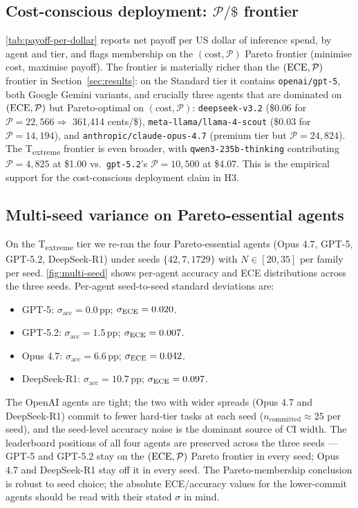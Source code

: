 \subsection{Cost-conscious deployment: $\mathcal{P}/\$$ frontier}
\autoref{tab:payoff-per-dollar} reports net payoff per US dollar of
inference spend, by agent and tier, and flags membership on the
$(\mathrm{cost}, \mathcal{P})$ Pareto frontier (minimise cost, maximise
payoff). The frontier is materially richer than the $(\mathrm{ECE}, \mathcal{P})$
frontier in Section~\ref{sec:results}: on the Standard tier it contains
\texttt{openai/gpt-5}, both Google Gemini variants, and crucially three
agents that are dominated on $(\mathrm{ECE}, \mathcal{P})$ but Pareto-optimal
on $(\mathrm{cost}, \mathcal{P})$: \texttt{deepseek-v3.2}
(\$0.06 for $\mathcal{P}=22{,}566 \Rightarrow$ 361{,}414 cents/\$),
\texttt{meta-llama/llama-4-scout} (\$0.03 for $\mathcal{P}=14{,}194$),
and \texttt{anthropic/claude-opus-4.7} (premium tier but
$\mathcal{P}=24{,}824$). The T\textsubscript{extreme} frontier is even
broader, with \texttt{qwen3-235b-thinking} contributing
$\mathcal{P}=4{,}825$ at \$1.00 vs.\ \texttt{gpt-5.2}'s $\mathcal{P}=10{,}500$
at \$4.07. This is the empirical support for the cost-conscious deployment
claim in H3.



\subsection{Multi-seed variance on Pareto-essential agents}
On the T\textsubscript{extreme} tier we re-ran the four
Pareto-essential agents (Opus 4.7, GPT-5, GPT-5.2, DeepSeek-R1) under
seeds $\{42, 7, 1729\}$ with $N \in [20, 35]$ per family per seed.
\autoref{fig:multi-seed} shows per-agent accuracy and ECE distributions
across the three seeds. Per-agent seed-to-seed standard deviations are:
\begin{itemize}
  \item GPT-5:        $\sigma_{\text{acc}} = 0.0$\,pp; $\sigma_{\mathrm{ECE}} = 0.020$.
  \item GPT-5.2:      $\sigma_{\text{acc}} = 1.5$\,pp; $\sigma_{\mathrm{ECE}} = 0.007$.
  \item Opus 4.7:     $\sigma_{\text{acc}} = 6.6$\,pp; $\sigma_{\mathrm{ECE}} = 0.042$.
  \item DeepSeek-R1:  $\sigma_{\text{acc}} = 10.7$\,pp; $\sigma_{\mathrm{ECE}} = 0.097$.
\end{itemize}
The OpenAI agents are tight; the two with wider spreads (Opus 4.7 and
DeepSeek-R1) commit to fewer hard-tier tasks at each seed
($n_{\text{committed}} \approx 25$ per seed), and the seed-level
accuracy noise is the dominant source of CI width. The leaderboard
positions of all four agents are preserved across the three seeds ---
GPT-5 and GPT-5.2 stay on the $(\mathrm{ECE}, \mathcal{P})$ Pareto frontier in
every seed; Opus 4.7 and DeepSeek-R1 stay off it in every seed. The
Pareto-membership conclusion is robust to seed choice; the absolute
ECE/accuracy values for the lower-commit agents should be read with
their stated $\sigma$ in mind.

